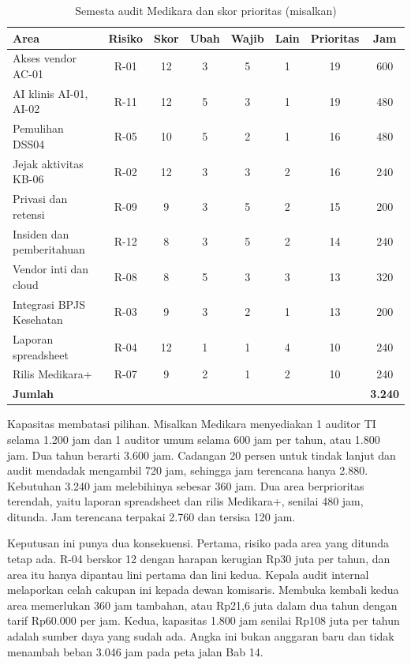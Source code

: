\begin{table}[!htb]
  \centering\small
  \caption{Semesta audit Medikara dan skor prioritas (misalkan)}\label{tab:ch12-semesta}
  \begin{tabularx}{\textwidth}{|>{\raggedright\arraybackslash}X|c|c|c|c|c|c|c|}
    \hline
    \textbf{Area} & \textbf{Risiko} & \textbf{Skor} & \textbf{Ubah} & \textbf{Wajib} &
    \textbf{Lain} & \textbf{Prioritas} & \textbf{Jam} \\ \hline
    Akses vendor AC-01 & R-01 & 12 & 3 & 5 & 1 & 19 & 600 \\ \hline
    AI klinis AI-01, AI-02 & R-11 & 12 & 5 & 3 & 1 & 19 & 480 \\ \hline
    Pemulihan DSS04 & R-05 & 10 & 5 & 2 & 1 & 16 & 480 \\ \hline
    Jejak aktivitas KB-06 & R-02 & 12 & 3 & 3 & 2 & 16 & 240 \\ \hline
    Privasi dan retensi & R-09 & 9 & 3 & 5 & 2 & 15 & 200 \\ \hline
    Insiden dan pemberitahuan & R-12 & 8 & 3 & 5 & 2 & 14 & 240 \\ \hline
    Vendor inti dan cloud & R-08 & 8 & 5 & 3 & 3 & 13 & 320 \\ \hline
    Integrasi BPJS Kesehatan & R-03 & 9 & 3 & 2 & 1 & 13 & 200 \\ \hline
    Laporan spreadsheet & R-04 & 12 & 1 & 1 & 4 & 10 & 240 \\ \hline
    Rilis Medikara+ & R-07 & 9 & 2 & 1 & 2 & 10 & 240 \\ \hline
    \textbf{Jumlah} & & & & & & & \textbf{3.240} \\ \hline
  \end{tabularx}
\end{table}

Kapasitas membatasi pilihan. Misalkan Medikara menyediakan 1 auditor TI selama 1.200 jam dan 1
auditor umum selama 600 jam per tahun, atau 1.800 jam. Dua tahun berarti 3.600 jam. Cadangan 20
persen untuk tindak lanjut dan audit mendadak mengambil 720 jam, sehingga jam terencana hanya
2.880. Kebutuhan 3.240 jam melebihinya sebesar 360 jam. Dua area berprioritas terendah, yaitu
laporan spreadsheet dan rilis Medikara+, senilai 480 jam, ditunda. Jam terencana terpakai 2.760
dan tersisa 120 jam.

Keputusan ini punya dua konsekuensi. Pertama, risiko pada area yang ditunda tetap ada. R-04
berskor 12 dengan harapan kerugian Rp30 juta per tahun, dan area itu hanya dipantau lini pertama
dan lini kedua. Kepala audit internal melaporkan celah cakupan ini kepada dewan komisaris. Membuka
kembali kedua area memerlukan 360 jam tambahan, atau Rp21,6 juta dalam dua tahun dengan tarif
Rp60.000 per jam. Kedua, kapasitas 1.800 jam senilai Rp108 juta per tahun adalah sumber daya yang
sudah ada. Angka ini bukan anggaran baru dan tidak menambah beban 3.046 jam pada peta jalan Bab 14.


